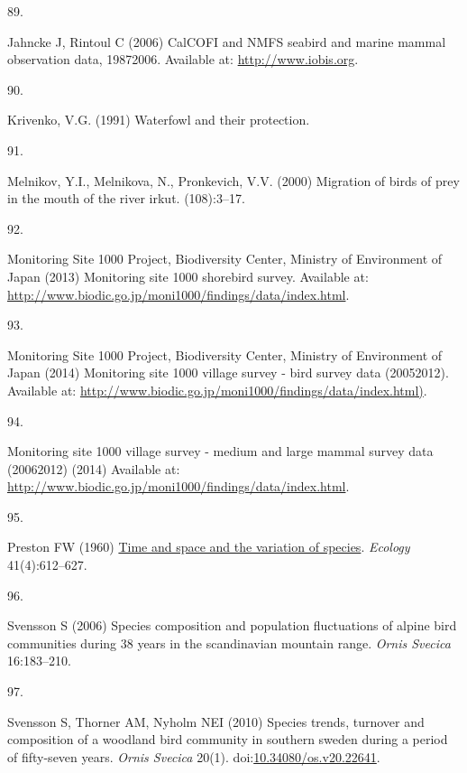\documentclass{article}
\newlength{\cslhangindent}
\newlength{\csllabelwidth}
\newlength{\cslentryspacingunit} %
\newenvironment{CSLReferences}[2] %
 {%
  \setlength{\parindent}{0pt}
  \ifodd #1
  \let\oldpar\par
  \def\par{\hangindent=\cslhangindent\oldpar}
  \fi
  \setlength{\parskip}{#2\cslentryspacingunit}
 }%
 {}
\newcommand{\CSLLeftMargin}[1]{\parbox[t]{\csllabelwidth}{#1}}
\newcommand{\CSLRightInline}[1]{\parbox[t]{\linewidth - \csllabelwidth}{#1}\break}
\begin{document}
\begin{CSLReferences}{0}{0}
\leavevmode{}%
\CSLLeftMargin{89. }%
\CSLRightInline{Jahncke J, Rintoul C (2006) CalCOFI and NMFS seabird and
marine mammal observation data, 1987{\textendash}2006. Available at:
\url{http://www.iobis.org}.}

\leavevmode{}%
\CSLLeftMargin{90. }%
\CSLRightInline{Krivenko, V.G. (1991) Waterfowl and their protection.}

\leavevmode{}%
\CSLLeftMargin{91. }%
\CSLRightInline{Melnikov, Y.I., Melnikova, N., Pronkevich, V.V. (2000)
Migration of birds of prey in the mouth of the river irkut.
(108):3--17.}

\leavevmode{}%
\CSLLeftMargin{92. }%
\CSLRightInline{Monitoring Site 1000 Project, Biodiversity Center,
Ministry of Environment of Japan (2013) Monitoring site 1000 shorebird
survey. Available at:
\url{http://www.biodic.go.jp/moni1000/findings/data/index.html}.}

\leavevmode{}%
\CSLLeftMargin{93. }%
\CSLRightInline{Monitoring Site 1000 Project, Biodiversity Center,
Ministry of Environment of Japan (2014) Monitoring site 1000 village
survey - bird survey data (2005{\textendash}2012). Available at:
\url{http://www.biodic.go.jp/moni1000/findings/data/index.html)}.}

\leavevmode{}%
\CSLLeftMargin{94. }%
\CSLRightInline{Monitoring site 1000 village survey - medium and large
mammal survey data (2006{\textendash}2012) (2014) Available at:
\url{http://www.biodic.go.jp/moni1000/findings/data/index.html}.}

\leavevmode{}%
\CSLLeftMargin{95. }%
\CSLRightInline{Preston FW (1960)
\href{https://doi.org/10.2307/1931793}{Time and space and the variation
of species}. \emph{Ecology} 41(4):612--627.}

\leavevmode{}%
\CSLLeftMargin{96. }%
\CSLRightInline{Svensson S (2006) Species composition and population
fluctuations of alpine bird communities during 38 years in the
scandinavian mountain range. \emph{Ornis Svecica} 16:183--210.}

\leavevmode{}%
\CSLLeftMargin{97. }%
\CSLRightInline{Svensson S, Thorner AM, Nyholm NEI (2010) Species
trends, turnover and composition of a woodland bird community in
southern sweden during a period of fifty-seven years. \emph{Ornis
Svecica} 20(1).
doi:\href{https://doi.org/10.34080/os.v20.22641}{10.34080/os.v20.22641}.}


\end{CSLReferences}
\end{document}
